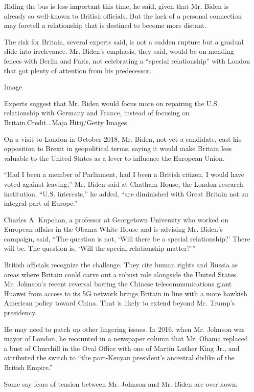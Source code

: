 Riding the bus is less important this time, he said, given that Mr.
Biden is already so well-known to British officials. But the lack of a
personal connection may foretell a relationship that is destined to
become more distant.

The risk for Britain, several experts said, is not a sudden rupture but
a gradual slide into irrelevance. Mr. Biden's emphasis, they said, would
be on mending fences with Berlin and Paris, not celebrating a ``special
relationship'' with London that got plenty of attention from his
predecessor.

Image

Experts suggest that Mr. Biden would focus more on repairing the U.S.
relationship with Germany and France, instead of focusing on
Britain.Credit...Maja Hitij/Getty Images

On a visit to London in October 2018, Mr. Biden, not yet a candidate,
cast his opposition to Brexit in geopolitical terms, saying it would
make Britain less valuable to the United States as a lever to influence
the European Union.

``Had I been a member of Parliament, had I been a British citizen, I
would have voted against leaving,'' Mr. Biden said at Chatham House, the
London research institution. ``U.S. interests,'' he added, ``are
diminished with Great Britain not an integral part of Europe.''

Charles A. Kupchan, a professor at Georgetown University who worked on
European affairs in the Obama White House and is advising Mr. Biden's
campaign, said, ``The question is not, `Will there be a special
relationship?' There will be. The question is, `Will the special
relationship matter?'''

British officials recognize the challenge. They cite human rights and
Russia as areas where Britain could carve out a robust role alongside
the United States. Mr. Johnson's recent reversal barring the Chinese
telecommunications giant Huawei from access to its 5G network brings
Britain in line with a more hawkish American policy toward China. That
is likely to extend beyond Mr. Trump's presidency.

He may need to patch up other lingering issues. In 2016, when Mr.
Johnson was mayor of London, he recounted in a newspaper column that Mr.
Obama replaced a bust of Churchill in the Oval Office with one of Martin
Luther King Jr., and attributed the switch to ``the part-Kenyan
president's ancestral dislike of the British Empire.''

Some say fears of tension between Mr. Johnson and Mr. Biden are
overblown.

